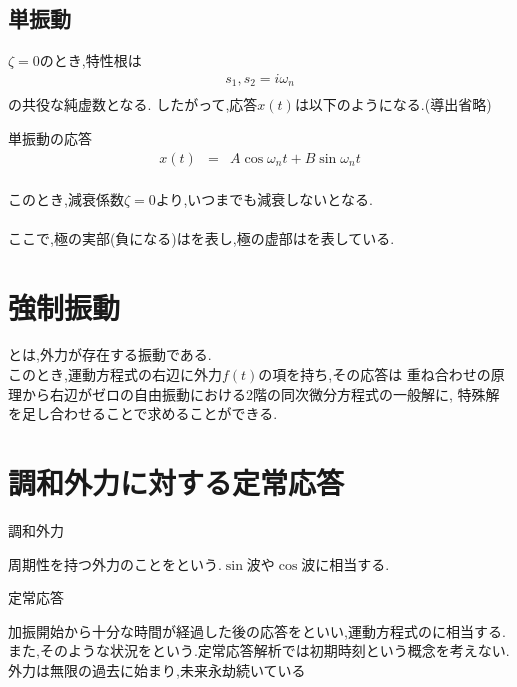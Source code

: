 \documentclass[a4paper]{jsarticle}
\begin{document}
\subsection{単振動}
$\zeta = 0$のとき,特性根は
\begin{eqnarray*}
    s_1,s_2=i\omega_n\\
\end{eqnarray*}
の共役な純虚数となる.
したがって,応答$x\left(t\right)$は以下のようになる.(導出省略)
\begin{itembox}[l]{単振動の応答}
    \begin{eqnarray*}
        x\left(t\right)&=&A\cos{\omega_nt}+B\sin{\omega_nt}\\
    \end{eqnarray*}
\end{itembox}
このとき,減衰係数$\zeta=0$より,いつまでも減衰しないとなる.\\
\\
ここで,極の実部(負になる)はを表し,極の虚部はを表している.
\section{強制振動}
とは,外力が存在する振動である.\\
このとき,運動方程式の右辺に外力$f\left(t\right)$の項を持ち,その応答は
重ね合わせの原理から右辺がゼロの自由振動における2階の同次微分方程式の一般解に,
特殊解を足し合わせることで求めることができる.\\
\section{調和外力に対する定常応答}
\begin{itembox}[l]{調和外力}
    \begin{center}
        周期性を持つ外力のことをという.$\sin$波や$\cos$波に相当する.
    \end{center}
\end{itembox}
\begin{itembox}[l]{定常応答}
    \begin{center}
        加振開始から十分な時間が経過した後の応答をといい,運動方程式のに相当する.\\
        また,そのような状況をという.定常応答解析では初期時刻という概念を考えない.\\
        外力は無限の過去に始まり,未来永劫続いている
    \end{center}
\end{itembox}
\end{document}
